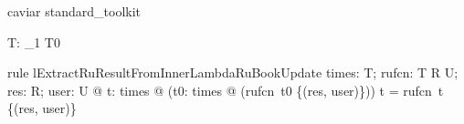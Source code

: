 \begin{zsection}
  \SECTION caviar \parents standard\_toolkit
\end{zsection}

\begin{zed}
  [T0, R, U]
\end{zed}

\begin{axdef}
  T: \power _1{} T0
\end{axdef}

\begin{theorem}{rule lExtractRuResultFromInnerLambdaRuBookUpdate}
\forall  times: \power  T; rufcn: T \fun  R \rel  U; res: R; user: U @ \forall  t: times @ (\lambda  t0: times @ (rufcn~t0 \cup  \{(res, user)\})) t = rufcn~t \cup  \{(res, user)\}
\end{theorem}
